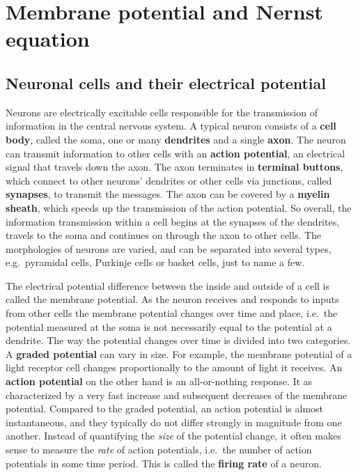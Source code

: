 \chapter{Membrane potential and Nernst equation}

\section{Neuronal cells and their electrical potential}

Neurons are electrically excitable cells responsible for the transmission of information in the central nervous system. A typical neuron consists of a \textbf{cell body}, called the soma, one or many \textbf{dendrites} and a single \textbf{axon}. The neuron can transmit information to other cells with an \textbf{action potential}, an electrical signal that travels down the axon. The axon terminates in \textbf{terminal buttons}, which connect to other neurons' dendrites or other cells via junctions, called \textbf{synapses}, to transmit the messages. The axon can be covered by a \textbf{myelin sheath}, which speeds up the transmission of the action potential. So overall, the information transmission within a cell begins at the synapses of the dendrites, travels to the soma and continues on through the axon to other cells. The morphologies of neurons are varied, and can be separated into several types, e.g.\ pyramidal cells, Purkinje cells or basket cells, just to name a few.

The electrical potential difference between the inside and outside of a cell is called the membrane potential. As the neuron receives and responds to inputs from other cells the membrane potential changes over time and place, i.e.\ the potential measured at the soma is not necessarily equal to the potential at a dendrite. The way the potential changes over time is divided into two categories. A \textbf{graded potential} can vary in size. For example, the membrane potential of a light receptor cell changes proportionally to the amount of light it receives. An \textbf{action potential} on the other hand is an all-or-nothing response. It as characterized by a very fast increase and subsequent decreases of the membrane potential. Compared to the graded potential, an action potential is almost instantaneous, and they typically do not differ strongly in magnitude from one another. Instead of quantifying the \textit{size} of the potential change, it often makes sense to measure the \textit{rate} of action potentials, i.e.\ the number of action potentials in some time period. This is called the \textbf{firing rate} of a neuron.

